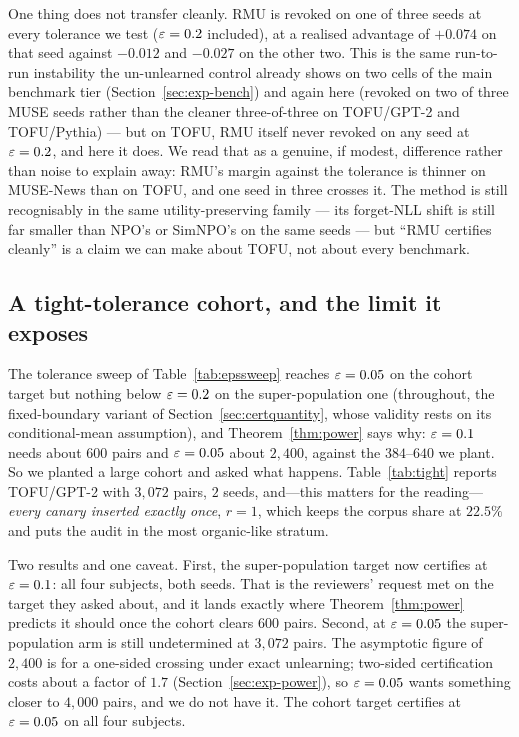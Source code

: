 One thing does not transfer cleanly. RMU is revoked on one of three seeds at every
tolerance we test ($\varepsilon=0.2$ included), at a realised advantage of $+0.074$ on that
seed against $-0.012$ and $-0.027$ on the other two. This is the same
run-to-run instability the un-unlearned control already shows on two cells of the main
benchmark tier (Section~\ref{sec:exp-bench}) and again here (revoked on two of three
MUSE seeds rather than the cleaner three-of-three on TOFU/GPT-2 and TOFU/Pythia) ---
but on TOFU, RMU itself never revoked on any seed at $\varepsilon=0.2$, and here it does. We
read that as a genuine, if modest, difference rather than noise to explain away: RMU's
margin against the tolerance is thinner on MUSE-News than on TOFU, and one seed in
three crosses it. The method is still recognisably in the same utility-preserving
family --- its forget-NLL shift is still far smaller than NPO's or SimNPO's on the same
seeds --- but ``RMU certifies cleanly'' is a claim we can make about TOFU, not about
every benchmark.

\begin{table}[t]
\centering\small
\caption{The RMU tier of Table~\ref{tab:rmu}, repeated unchanged on MUSE-News/GPT-2
(three seeds, $512$ pairs, cohort target, matching the MUSE-News cohort size used
elsewhere in this study). Same columns as Table~\ref{tab:rmu}.}
\label{tab:rmu-muse}

\end{table}

\subsection{A tight-tolerance cohort, and the limit it exposes}\label{sec:exp-tight}

The tolerance sweep of Table~\ref{tab:epssweep} reaches $\varepsilon = 0.05$ on the cohort
target but nothing below $\varepsilon = 0.2$ on the super-population one (throughout, the fixed-boundary variant of
Section~\ref{sec:certquantity}, whose validity rests on its conditional-mean assumption), and
Theorem~\ref{thm:power} says why: $\varepsilon = 0.1$ needs about $600$ pairs and
$\varepsilon = 0.05$ about $2{,}400$, against the $384$--$640$ we plant. So we planted a large
cohort and asked what happens. Table~\ref{tab:tight} reports TOFU/GPT-2 with $3{,}072$
pairs, $2$ seeds, and---this matters for the reading---\emph{every canary inserted
exactly once}, $r = 1$, which keeps the corpus share at $22.5\%$ and puts the audit in
the most organic-like stratum.

Two results and one caveat. First, the super-population target now certifies at
$\varepsilon = 0.1$: all four subjects, both seeds. That is the reviewers' request met on the
target they asked about, and it lands exactly where Theorem~\ref{thm:power} predicts
it should once the cohort clears $600$ pairs. Second, at $\varepsilon = 0.05$ the
super-population arm is still undetermined at $3{,}072$ pairs. The asymptotic figure of
$2{,}400$ is for a one-sided crossing under exact unlearning; two-sided certification
costs about a factor of $1.7$ (Section~\ref{sec:exp-power}), so $\varepsilon = 0.05$ wants
something closer to $4{,}000$ pairs, and we do not have it. The cohort target certifies
at $\varepsilon = 0.05$ on all four subjects.

